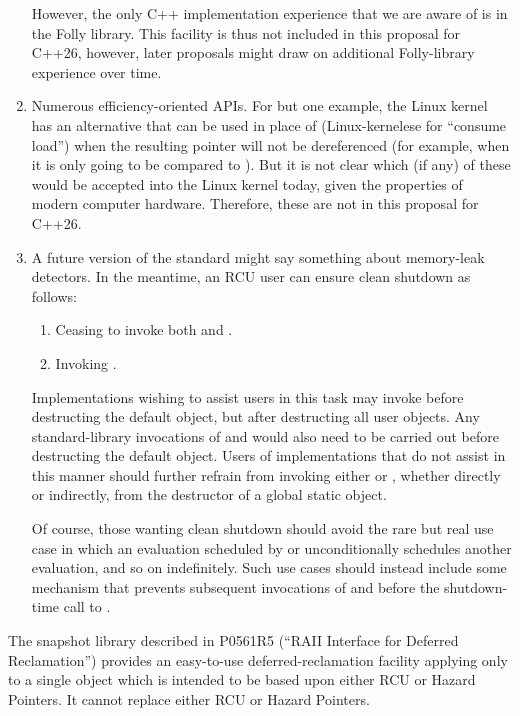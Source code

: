 \begin{enumerate}
	However, the only C++ implementation experience that we are
	aware of is in the Folly library.
	This facility is thus not included in this proposal for C++26,
	however, later proposals might draw on additional Folly-library
	experience over time.
\item	Numerous efficiency-oriented APIs.
	For but one example, the Linux kernel has an alternative
	 that can be used in place
	of  (Linux-kernelese for ``consume load'')
	when the resulting pointer will not be dereferenced
	(for example, when it is only going to be compared to ).
	But it is not clear which (if any) of these would be accepted
	into the Linux kernel today, given the properties of modern
	computer hardware.
	Therefore, these are not in this proposal for C++26.
\item	A future version of the standard might say something about
	memory-leak detectors.
	In the meantime, an RCU user can ensure clean shutdown as follows:
	\begin{enumerate}
	\item	Ceasing to invoke both  and
		.
	\item	Invoking .
	\end{enumerate}
	Implementations wishing to assist users in this task may
	invoke  before destructing the default
	 object, but after destructing all user objects.
	Any standard-library invocations of  and
	 would also need to be carried out before
	destructing the default  object.
	Users of implementations that do not assist in this manner
	should further refrain from invoking either 
	or , whether directly or indirectly, from the
	destructor of a global static object.

	Of course, those wanting clean shutdown should avoid the rare
	but real use case in which an evaluation scheduled by
	 or  unconditionally
	schedules another evaluation, and so on indefinitely.
	Such use cases should instead include some mechanism that prevents
	subsequent invocations of  and 
	before the shutdown-time call to .
\end{enumerate}

The snapshot library described in P0561R5 (``RAII Interface for Deferred
Reclamation'') provides an easy-to-use deferred-reclamation facility
applying only to a single object which is intended to be based upon
either RCU or Hazard Pointers.
It cannot replace either RCU or Hazard Pointers.

